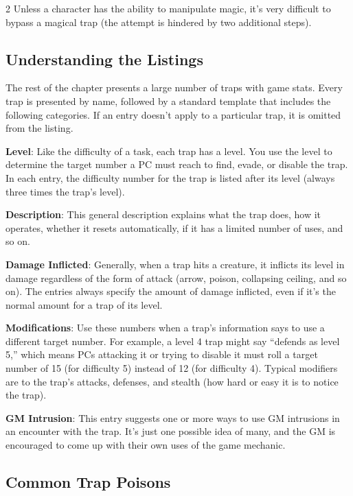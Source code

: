 \begin{multicols}{2}
Unless a character has the ability to manipulate magic, it’s very difficult to bypass a magical trap (the attempt is hindered by two additional steps).

\subsection{Understanding the Listings}

The rest of the chapter presents a large number of traps with game stats. Every trap is presented by name, followed by a standard template that includes the following categories. If an entry doesn’t apply to a particular trap, it is omitted from the listing. 

\textbf{Level}: Like the difficulty of a task, each trap has a level. You use the level to determine the target number a PC must reach to find, evade, or disable the trap. In each entry, the difficulty number for the trap is listed after its level (always three times the trap’s level). 

\textbf{Description}: This general description explains what the trap does, how it operates, whether it resets automatically, if it has a limited number of uses, and so on.

\textbf{Damage Inflicted}: Generally, when a trap hits a creature, it inflicts its level in damage regardless of the form of attack (arrow, poison, collapsing ceiling, and so on). The entries always specify the amount of damage inflicted, even if it’s the normal amount for a trap of its level. 

\textbf{Modifications}: Use these numbers when a trap’s information says to use a different target number. For example, a level 4 trap might say “defends as level 5,” which means PCs attacking it or trying to disable it must roll a target number of 15 (for difficulty 5) instead of 12 (for difficulty 4). Typical modifiers are to the trap’s attacks, defenses, and stealth (how hard or easy it is to notice the trap). 

\textbf{GM Intrusion}: This entry suggests one or more ways to use GM intrusions in an encounter with the trap. It’s just one possible idea of many, and the GM is encouraged to come up with their own uses of the game mechanic.

\subsection{Common Trap Poisons}


\end{multicols}
